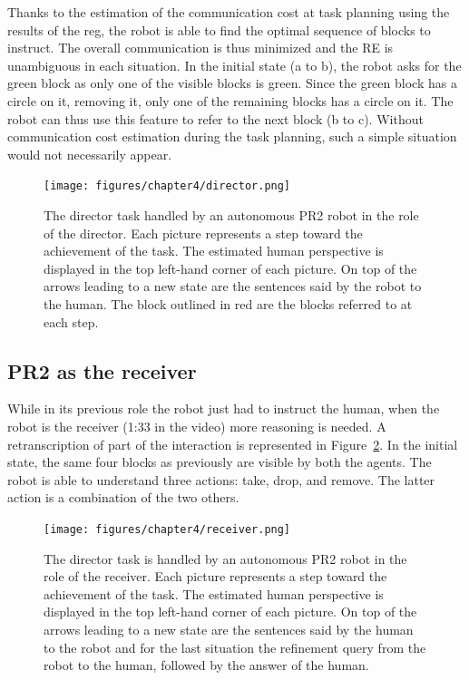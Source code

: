 \documentclass[a4paper,11pt,twoside]{StyleThese}
\begin{document}
Thanks to the estimation of the communication cost at task planning using the results of the \acrshort{reg}, the robot is able to find the optimal sequence of blocks to instruct. The overall communication is thus minimized and the RE is unambiguous in each situation. In the initial state (a to b), the robot asks for the green block as only one of the visible blocks is green. Since the green block has a circle on it, removing it, only one of the remaining blocks has a circle on it. The robot can thus use this feature to refer to the next block (b to c). Without communication cost estimation during the task planning, such a simple situation would not necessarily appear.

\begin{figure}[ht!]
	\centering
	\texttt{[image: figures/chapter4/director.png]}
	\caption{\label{chap9:fig:director} The director task handled by an autonomous PR2 robot in the role of the director. Each picture represents a step toward the achievement of the task. The estimated human perspective is displayed in the top left-hand corner of each picture. On top of the arrows leading to a new state are the sentences said by the robot to the human. The block outlined in red are the blocks referred to at each step. }
\end{figure}

\subsection{PR2 as the receiver}

While in its previous role the robot just had to instruct the human, when the robot is the receiver (1:33 in the video) more reasoning is needed. A retranscription of part of the interaction is represented in Figure~\ref{chap9:fig:receiver}. In the initial state, the same four blocks as previously are visible by both the agents. The robot is able to understand three actions: take, drop, and remove. The latter action is a combination of the two others.

\begin{figure}[ht!]
	\centering
	\texttt{[image: figures/chapter4/receiver.png]}
	\caption{\label{chap9:fig:receiver} The director task is handled by an autonomous PR2 robot in the role of the receiver. Each picture represents a step toward the achievement of the task. The estimated human perspective is displayed in the top left-hand corner of each picture. On top of the arrows leading to a new state are the sentences said by the human to the robot and for the last situation the refinement query from the robot to the human, followed by the answer of the human. }
\end{figure}
\end{document}
